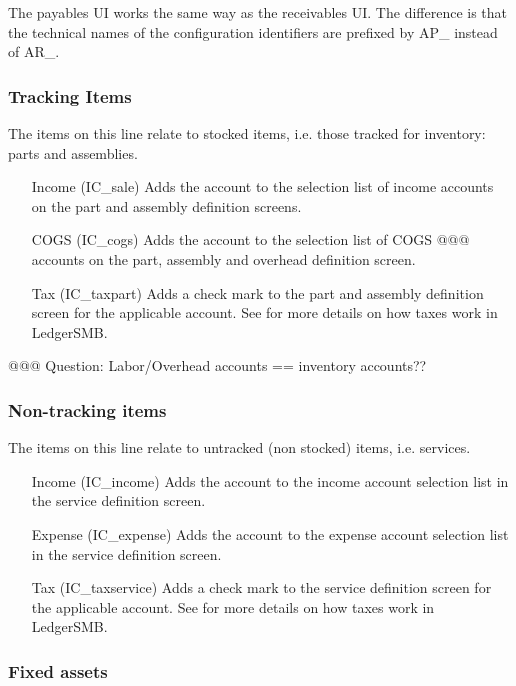 The payables UI works the same way as the receivables UI. The difference is
that the technical names of the configuration identifiers are prefixed by AP\_ instead
of AR\_.

\subsubsection{Tracking Items}

The items on this line relate to stocked items, i.e. those tracked for inventory: parts and
assemblies.

\begin{enumerate}
\item[Income (IC\_sale)] Adds the account to the selection list of income accounts on the
   part and assembly definition screens.
\item[COGS (IC\_cogs)] Adds the account to the selection list of COGS @@@ accounts on the
   part, assembly and overhead definition screen.
\item[Tax (IC\_taxpart)] Adds a check mark to the part and assembly definition screen
   for the applicable account. See  for more details on how taxes
   work in LedgerSMB.
\end{enumerate}

@@@ Question: Labor/Overhead accounts == inventory accounts??

\subsubsection{Non-tracking items}

The items on this line relate to untracked (non stocked) items, i.e. services.

\begin{enumerate}
\item[Income (IC\_income)] Adds the account to the income account selection list in
   the service definition screen.
\item[Expense (IC\_expense)] Adds the account to the expense account selection list in
   the service definition screen.
\item[Tax (IC\_taxservice)] Adds a check mark to the service definition screen for the
   applicable account. See  for more details on how taxes work in LedgerSMB.
\end{enumerate}

\subsubsection{Fixed assets}

